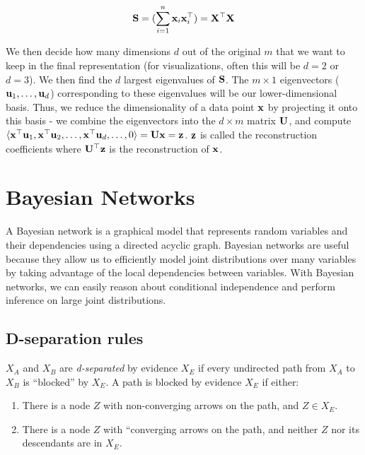 \documentclass[11pt,letterpaper]{article}
\begin{document}
  \[ \mathbf{S} = (\sum_{i=1}^n   \mathbf{x}_i\mathbf{x}_i^\top)  = \mathbf{X}^\top \mathbf{X} \]
  
We then decide how many dimensions $d$ out of the original $m$ that we want to keep in the final representation (for visualizations, often this will be $d=2$ or $d=3$). We then find the $d$ largest eigenvalues of $\mathbf{S}$. The $m \times 1$ eigenvectors ($\mathbf{u}_1, \dots ,\mathbf{u}_d$) corresponding to these eigenvalues will be our lower-dimensional basis. Thus, we reduce the dimensionality of a data point $\mathbf{x}$ by projecting it onto this basis - we combine the eigenvectors into the $d \times m$ matrix $\mathbf{U}$, and compute $\langle \mathbf{x}^\top\mathbf{u}_1, \mathbf{x}^\top\mathbf{u}_2, \ldots, \mathbf{x}^\top \mathbf{u}_d, \ldots, 0 \rangle = \mathbf{U}\mathbf{x} = \mathbf{z}$. $\mathbf{z}$ is called the reconstruction coefficients where $\mathbf{U}^\top \mathbf{z}$ is the reconstruction of $\mathbf{x}$.

\section{Bayesian Networks}

A Bayesian network is a graphical model that represents random variables and their dependencies using a directed acyclic graph. Bayesian networks are useful because they allow us to efficiently model joint distributions over many variables by taking advantage of the local dependencies between variables. With Bayesian networks, we can easily reason about conditional independence and perform inference on large joint distributions.

\subsection{D-separation rules}

$X_A$ and $X_B$ are \textit{d-separated} by evidence $X_E$ if every undirected path from $X_A$ to $X_B$ is ``blocked'' by $X_E$. A path is blocked by evidence $X_E$ if either:

\begin{enumerate}
\item There is a node $Z$ with non-converging arrows on the path, and $Z \in X_E$.
\item There is a node $Z$ with ``converging arrows on the path, and neither $Z$ nor its descendants are in $X_E$.
\end{enumerate}
\newpage
\end{document}
